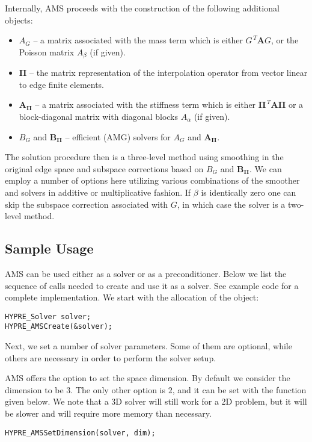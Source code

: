 \noindent
Internally, AMS proceeds with the construction of the following additional objects:
\begin{itemize}
\item $A_G$ -- a matrix associated with the mass term which is either $G^{\,T} {\mathbf A} G$, or the Poisson matrix $A_\beta$ (if given).
\item ${\mathbf \Pi}$ -- the matrix representation of the interpolation operator
from vector linear to edge finite elements.
\item ${\mathbf A}_{{\mathbf \Pi}}$ -- a matrix associated with the stiffness term which is either  ${\mathbf \Pi}^{\,T} {\mathbf A} {\mathbf \Pi}$ or a block-diagonal matrix with diagonal blocks $A_\alpha$ (if given).
\item $B_G$ and ${\mathbf B}_{{\mathbf \Pi}}$ -- efficient (AMG) solvers for $A_G$ and ${\mathbf A}_{{\mathbf \Pi}}$.
\end{itemize}
The solution procedure then is a three-level method using smoothing in
the original edge space and subspace corrections based on $B_G$ and ${\mathbf B}_{{\mathbf \Pi}}$.
We can employ a number of options here utilizing various combinations of the smoother
and solvers in additive or multiplicative fashion.
If $\beta$ is identically zero one can skip the subspace correction associated
with $G$, in which case the solver is a two-level method.

\subsection{Sample Usage}
AMS can be used either as a solver or as a preconditioner.
Below we list the sequence of \hypre{} calls
needed to create and use it as a solver.
See example code  for a complete implementation.
We start with the allocation of the  object:
\begin{display}\begin{verbatim}
HYPRE_Solver solver;
HYPRE_AMSCreate(&solver);
\end{verbatim}\end{display}

Next, we set a number of solver parameters. Some of them are
optional, while others are necessary in order to perform the
solver setup.

AMS offers the option to set the space dimension.
By default we consider the dimension to be $3$. The only
other option is $2$, and it can be set with the function given below.
We note that a 3D solver will still work for a 2D problem,
but it will be slower and will require more memory than necessary.
\begin{display}\begin{verbatim}
HYPRE_AMSSetDimension(solver, dim);
\end{verbatim}\end{display}

